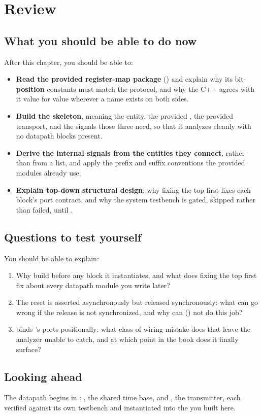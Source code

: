 
\section{Review}
\label{c1:sec:review}

\subsection*{What you should be able to do now}
After this chapter, you should be able to:
\begin{itemize}
  \item \textbf{Read the provided register-map package} () and explain why its
     bit-\textbf{position} constants must match the protocol, and why the C++
     agrees with it value for value wherever a name exists on both sides.
  \item \textbf{Build the  skeleton}, meaning the entity, the provided
    , the provided transport, and the signals those three need, so that it analyzes
    cleanly with no datapath blocks present.
  \item \textbf{Derive the internal signals from the entities they connect}, rather than from a
    list, and apply the  prefix and  suffix conventions the provided modules
    already use.
  \item \textbf{Explain top-down structural design}: why fixing the top first fixes each block's
    port contract, and why the system testbench is gated, skipped rather than failed, until
    .
\end{itemize}

\subsection*{Questions to test yourself}
You should be able to explain:
\begin{enumerate}
  \item Why build  before any block it instantiates, and what does fixing the top
    first fix about every datapath module you write later?
  \item The reset is asserted asynchronously but released synchronously: what can go wrong if the
    release is not synchronized, and why can  () not do this job?
  \item {} binds 's ports positionally: what class of wiring mistake
    does that leave the analyzer unable to catch, and at which point in the book does it finally
    surface?
\end{enumerate}

\subsection*{Looking ahead}
The datapath begins in : , the shared time base, and , the
transmitter, each verified against its own testbench and instantiated into the  you
built here.
